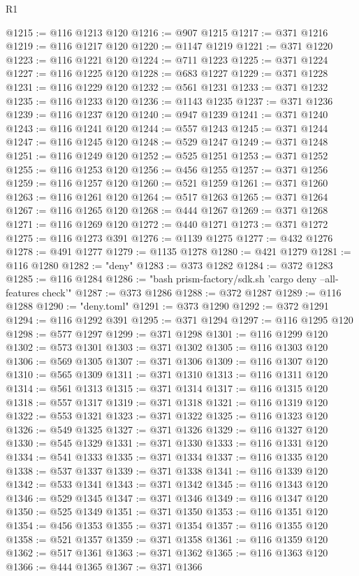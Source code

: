 \begin{lexlean}{R1}
\begin{coremodule}
@1215 := @116 @1213 @120
@1216 := @907 @1215
@1217 := @371 @1216
@1219 := @116 @1217 @120
@1220 := @1147 @1219
@1221 := @371 @1220
@1223 := @116 @1221 @120
@1224 := @711 @1223
@1225 := @371 @1224
@1227 := @116 @1225 @120
@1228 := @683 @1227
@1229 := @371 @1228
@1231 := @116 @1229 @120
@1232 := @561 @1231
@1233 := @371 @1232
@1235 := @116 @1233 @120
@1236 := @1143 @1235
@1237 := @371 @1236
@1239 := @116 @1237 @120
@1240 := @947 @1239
@1241 := @371 @1240
@1243 := @116 @1241 @120
@1244 := @557 @1243
@1245 := @371 @1244
@1247 := @116 @1245 @120
@1248 := @529 @1247
@1249 := @371 @1248
@1251 := @116 @1249 @120
@1252 := @525 @1251
@1253 := @371 @1252
@1255 := @116 @1253 @120
@1256 := @456 @1255
@1257 := @371 @1256
@1259 := @116 @1257 @120
@1260 := @521 @1259
@1261 := @371 @1260
@1263 := @116 @1261 @120
@1264 := @517 @1263
@1265 := @371 @1264
@1267 := @116 @1265 @120
@1268 := @444 @1267
@1269 := @371 @1268
@1271 := @116 @1269 @120
@1272 := @440 @1271
@1273 := @371 @1272
@1275 := @116 @1273 @391
@1276 := @1139 @1275
@1277 := @432 @1276
@1278 := @491 @1277
@1279 := @1135 @1278
@1280 := @421 @1279
@1281 := @116 @1280
@1282 := "deny"
@1283 := @373 @1282
@1284 := @372 @1283
@1285 := @116 @1284
@1286 := "bash prism-factory/sdk.sh 'cargo deny --all-features check'"
@1287 := @373 @1286
@1288 := @372 @1287
@1289 := @116 @1288
@1290 := "deny.toml"
@1291 := @373 @1290
@1292 := @372 @1291
@1294 := @116 @1292 @391
@1295 := @371 @1294
@1297 := @116 @1295 @120
@1298 := @577 @1297
@1299 := @371 @1298
@1301 := @116 @1299 @120
@1302 := @573 @1301
@1303 := @371 @1302
@1305 := @116 @1303 @120
@1306 := @569 @1305
@1307 := @371 @1306
@1309 := @116 @1307 @120
@1310 := @565 @1309
@1311 := @371 @1310
@1313 := @116 @1311 @120
@1314 := @561 @1313
@1315 := @371 @1314
@1317 := @116 @1315 @120
@1318 := @557 @1317
@1319 := @371 @1318
@1321 := @116 @1319 @120
@1322 := @553 @1321
@1323 := @371 @1322
@1325 := @116 @1323 @120
@1326 := @549 @1325
@1327 := @371 @1326
@1329 := @116 @1327 @120
@1330 := @545 @1329
@1331 := @371 @1330
@1333 := @116 @1331 @120
@1334 := @541 @1333
@1335 := @371 @1334
@1337 := @116 @1335 @120
@1338 := @537 @1337
@1339 := @371 @1338
@1341 := @116 @1339 @120
@1342 := @533 @1341
@1343 := @371 @1342
@1345 := @116 @1343 @120
@1346 := @529 @1345
@1347 := @371 @1346
@1349 := @116 @1347 @120
@1350 := @525 @1349
@1351 := @371 @1350
@1353 := @116 @1351 @120
@1354 := @456 @1353
@1355 := @371 @1354
@1357 := @116 @1355 @120
@1358 := @521 @1357
@1359 := @371 @1358
@1361 := @116 @1359 @120
@1362 := @517 @1361
@1363 := @371 @1362
@1365 := @116 @1363 @120
@1366 := @444 @1365
@1367 := @371 @1366

\end{coremodule}
\end{lexlean}

